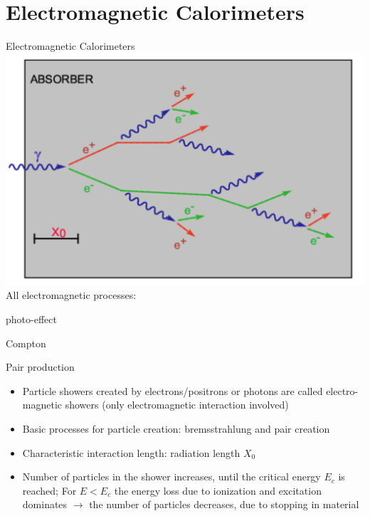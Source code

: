 \documentclass[style=husky,clock,size=9pt,dvipsnames]{powerdot}
\newcommand\ra{$\rightarrow$} %
\begin{document}
\section{Electromagnetic Calorimeters}
\begin{wideslide}[trans=Fly,toc=]{Electromagnetic Calorimeters}
	{\includegraphics[width=\linewidth]{Figures/em_calorimeter}}
	All electromagnetic processes:
	\begin{itemize}
		{
			\item<1-> photo-effect
			\item<1-> Compton
			\item<1-> Pair production
		}
	\end{itemize}
	\begin{itemize}
		\item<2-> Particle showers created by electrons/positrons or photons are called electro- magnetic showers (only electromagnetic interaction involved)
		\item<3-> Basic processes for particle creation: bremsstrahlung and pair creation
		\item<4-> Characteristic interaction length: radiation length $X_0$
		\item<5-> Number of particles in the shower increases, until the critical energy $E_c$ is reached; For $E < E_c$ the energy loss due to ionization and excitation dominates \ra
		the number of particles decreases, due to stopping in material
	\end{itemize}
\end{wideslide}
\end{document}
